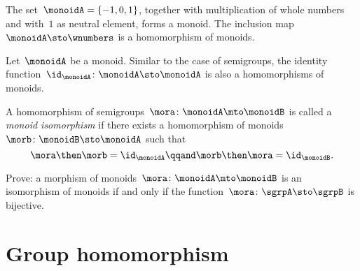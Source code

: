 \begin{example}
  The set~$\monoidA = \{ -1, 0, 1 \}$, together with multiplication of whole numbers and with~$1$ as neutral element, forms a monoid. The inclusion map~$\monoidA \sto \wnumbers$ is a homomorphism of monoids.
\end{example}



\begin{definition}
  \label{def:identity-mon-mor}
  Let~$\monoidA$ be a monoid. Similar to the case of semigroups, the identity function~$\id_\monoidA\colon \monoidA \sto \monoidA$ is also a homomorphisms of monoids.
\end{definition}



\begin{definition}
  \label{def:monoid-iso}
  A homomorphism of semigroups~$\mora\colon \monoidA \mto \monoidB$ is called a \emph{monoid isomorphism} if there exists a homomorphism of monoids~$\morb\colon \monoidB \sto \monoidA$ such that
  \begin{equation}
    \mora \then \morb = \id_\monoidA \qqand \morb \then \mora = \id_\monoidB.
  \end{equation}
\end{definition}


\begin{exercise}
  Prove: a morphism of monoids~$\mora\colon \monoidA \mto \monoidB$ is an isomorphism of monoids if and only if the function~$\mora\colon \sgrpA \sto \sgrpB$ is bijective.
\end{exercise}
\begin{solution}
\end{solution}


\section{Group homomorphism}




